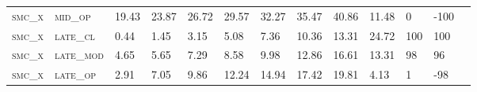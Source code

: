 \begin{landscape}
\begin{table}[!htbp]
\begin{tabular}{@{}lllllllllllll@{}}
\footnotesize \textsc{smc\_x}      & \footnotesize \textsc{mid\_op   }     & \footnotesize 19.43           & \footnotesize 23.87           & \footnotesize 26.72            & \footnotesize 29.57            & \footnotesize 32.27            & \footnotesize 35.47           & \footnotesize 40.86        & \footnotesize 11.48    & \footnotesize 0    & \footnotesize -100     \\
\footnotesize \textsc{smc\_x}      & \footnotesize \textsc{late\_cl  }     & \footnotesize 0.44           & \footnotesize 1.45           & \footnotesize 3.15            & \footnotesize 5.08            & \footnotesize 7.36            & \footnotesize 10.36           & \footnotesize 13.31        & \footnotesize 24.72    & \footnotesize 100    & \footnotesize 100     \\
\footnotesize \textsc{smc\_x}      & \footnotesize \textsc{late\_mod }     & \footnotesize 4.65           & \footnotesize 5.65           & \footnotesize 7.29            & \footnotesize 8.58            & \footnotesize 9.98            & \footnotesize 12.86           & \footnotesize 16.61        & \footnotesize 13.31    & \footnotesize 98    & \footnotesize 96     \\
\footnotesize \textsc{smc\_x}      & \footnotesize \textsc{late\_op  }     & \footnotesize 2.91           & \footnotesize 7.05           & \footnotesize 9.86            & \footnotesize 12.24            & \footnotesize 14.94            & \footnotesize 17.42           & \footnotesize 19.81        & \footnotesize 4.13    & \footnotesize 1    & \footnotesize -98     \\ \bottomrule 
\end{tabular}
\end{table}
\end{landscape}



\clearpage
\pagebreak[4]

